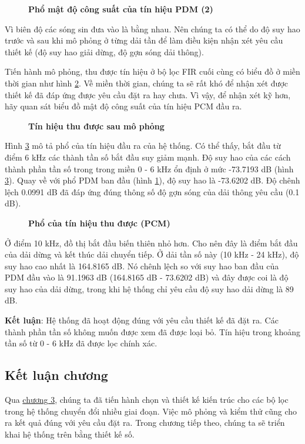\begin{figure}[H]
    \centering
    
    \caption[Phổ mật độ công suất của tín hiệu PDM (2)]{\bfseries \fontsize{12pt}{0pt}\selectfont Phổ mật độ công suất của tín hiệu PDM (2)}
    \label{sd3}
\end{figure}

Vì biên độ các sóng sin đưa vào là bằng nhau. Nên chúng ta có thể do độ suy hao trước và sau khi mô phỏng ở từng dải tần để làm điều kiện nhận xét yêu cầu thiết kế (độ suy hao giải dừng, độ gợn sóng dải thông).

Tiến hành mô phỏng, thu được tín hiệu ở bộ lọc FIR cuối cùng có biểu đồ ở miền thời gian như hình \ref{pcm_o}. Về miền thời gian, chúng ta sẽ rất khó để nhận xét được thiết kế đã đáp ứng được yêu cầu đặt ra hay chưa. Vì vậy, để nhận xét kỹ hơn, hãy quan sát biểu đồ mật độ công suất của tín hiệu PCM đầu ra.
\begin{figure}[H]
    \centering
    
    \caption[Tín hiệu thu được sau mô phỏng]{\bfseries \fontsize{12pt}{0pt}\selectfont Tín hiệu thu được sau mô phỏng}
    \label{pcm_o}
\end{figure}

Hình \ref{psd_pcm} mô tả phổ của tín hiệu đầu ra của hệ thống. Có thể thấy, bắt đầu từ điểm 6 kHz các thành tần số bắt đầu suy giảm mạnh. Độ suy hao của các cách thành phần tần số trong trong miền 0 - 6 kHz ổn định ở mức -73.7193 dB (hình \ref{psd_pcm}). Quay về với phổ PDM ban đầu (hình \ref{sd3}), độ suy hao là -73.6202 dB. Độ chênh lệch 0.0991 dB đã đáp ứng đúng thông số độ gợn sóng của dải thông yêu cầu (0.1 dB). 
\begin{figure}[H]
    \centering
    
    \caption[Phổ của tín hiệu thu được (PCM)]{\bfseries \fontsize{12pt}{0pt}\selectfont Phổ của tín hiệu thu được (PCM)}
    \label{psd_pcm}
\end{figure}

Ở điểm 10 kHz, đồ thị bắt đầu biến thiên nhỏ hơn. Cho nên đây là điểm bắt đầu của dải dừng và kết thúc dải chuyển tiếp. Ở dải tần số này (10 kHz - 24 kHz), độ suy hao cao nhất là 164.8165 dB. Nó chênh lệch so với suy hao ban đầu của PDM đầu vào là 91.1963 dB (164.8165 dB - 73.6202 dB) và đây được coi là độ suy hao của dải dừng, trong khi hệ thống chỉ yêu cầu độ suy hao dải dừng là 89 dB.

\textbf{Kết luận}: Hệ thống đã hoạt động đúng với yêu cầu thiết kế đã đặt ra. Các thành phần tần số không muốn được xem đã được loại bỏ. Tín hiệu trong khoảng tần số từ 0 - 6 kHz đã được lọc chính xác.


\subsection{Kết luận chương}

Qua \hyperref[chuong3]{chương 3}, chúng ta đã tiến hành chọn và thiết kế kiến trúc cho các bộ lọc trong hệ thống chuyển đổi nhiều giai đoạn. Việc mô phỏng và kiểm thử cũng cho ra kết quả đúng với yêu cầu đặt ra. Trong chương tiếp theo, chúng ta sẽ triển khai hệ thống trên bằng thiết kế số.
\newpage

